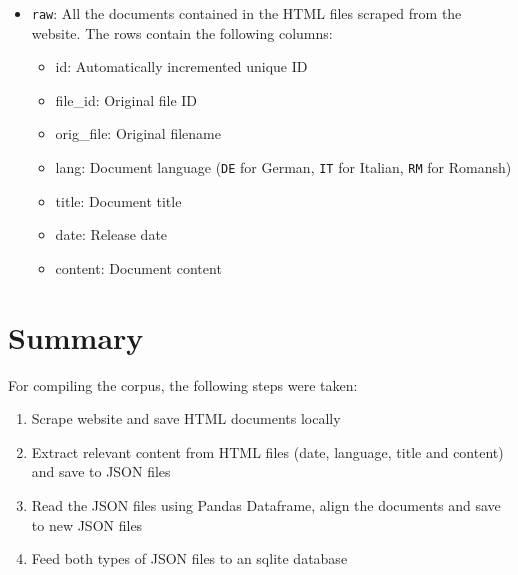 \begin{itemize}
	\item \texttt{raw}: All the documents contained in the HTML files scraped from the website. 
	The rows contain the following columns:
	\begin{itemize}
		\item id: Automatically incremented unique ID
		\item file\_id: Original file ID
		\item orig\_file: Original filename
		\item lang: Document language (\texttt{DE} for German, \texttt{IT} for Italian, \texttt{RM} for Romansh)
		\item title: Document title
		\item date: Release date
		\item content: Document content
	\end{itemize}
\end{itemize}



\section{Summary}
For compiling the corpus, the following steps were taken:
\begin{enumerate}
	\item Scrape website and save HTML documents locally
	\item Extract relevant content from HTML files (date, language, title and content) and save to JSON files
	\item Read the JSON files using Pandas Dataframe, align the documents and save to new JSON files
	\item Feed both types of JSON files to an sqlite database
\end{enumerate}


